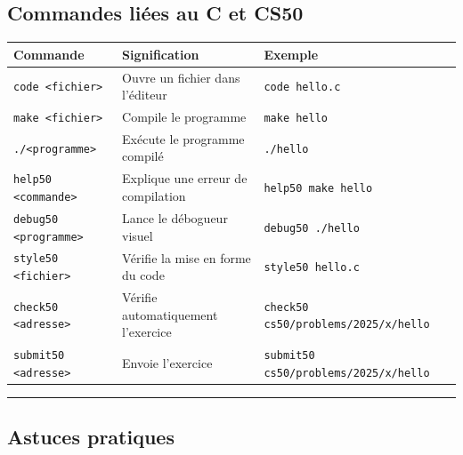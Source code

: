 \subsection{Commandes liées au C et CS50}

\begin{center}
	\begin{tabular}{|l|l|l|}
		\hline
		Commande                     & Signification                      & Exemple                                      \\
		\hline
		\texttt{code <fichier>}      & Ouvre un fichier dans l’éditeur    & \texttt{code hello.c}                        \\
		\texttt{make <fichier>}      & Compile le programme               & \texttt{make hello}                          \\
		\texttt{./<programme>}       & Exécute le programme compilé       & \texttt{./hello}                             \\
		\texttt{help50 <commande>}   & Explique une erreur de compilation & \texttt{help50 make hello}                   \\
		\texttt{debug50 <programme>} & Lance le débogueur visuel          & \texttt{debug50 ./hello}                     \\
		\texttt{style50 <fichier>}   & Vérifie la mise en forme du code   & \texttt{style50 hello.c}                     \\
		\texttt{check50 <adresse>}   & Vérifie automatiquement l’exercice & \texttt{check50 cs50/problems/2025/x/hello}  \\
		\texttt{submit50 <adresse>}  & Envoie l’exercice                  & \texttt{submit50 cs50/problems/2025/x/hello} \\
		\hline
	\end{tabular}
\end{center}
\hrule
\subsection{Astuces pratiques}

